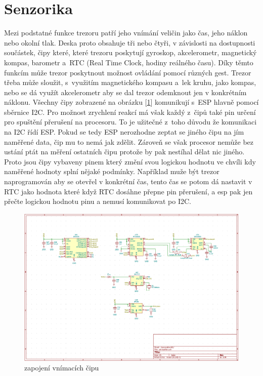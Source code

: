 \section{Senzorika}


Mezi podstatné funkce trezoru patří jeho vnímání veličin jako čas, jeho náklon nebo okolní tlak.
Deska proto obsahuje tři nebo čtyři, v závislosti na dostupnosti součástek, čipy které, které trezoru poskytují gyroskop, akcelerometr, magnetický kompas,
barometr a~RTC (Real Time Clock, hodiny reálného času). Díky těmto funkcím může trezor poskytnout možnost ovládání pomocí různých gest. Trezor třeba může 
sloužit, s~využitím magnetického kompasu a~lek kruhu, jako kompas, nebo se dá využít akcelerometr aby se dal trezor odemknout jen v konkrétním náklonu.
Všechny čipy zobrazené na obrázku [\ref{fig:E4-sch_vnimani}] komunikují s~ESP hlavně pomocí sběrnice I2C. Pro možnost zrychlení reakcí má však každý 
z~čipů také pin určení pro spuštění přerušení na procesoru. To je užitečné z~toho důvodu že komunikaci na I2C řídí ESP. Pokud se tedy ESP nerozhodne 
zeptat se jiného čipu na jím naměřené data, čip mu to nemá jak zdělit. Zároveň se však procesor nemůže bez ustání ptát na měření ostatních čipu 
protože by pak nestíhal dělat nic jiného. Proto jsou čipy vybaveny pinem který změní svou logickou hodnotu ve chvíli kdy naměřené hodnoty splní nějaké 
podmínky. 
Například muže být trezor naprogramován aby se otevřel v konkrétní čas, tento čas se potom dá nastavit v RTC jako hodnota které když RTC 
dosáhne přepne pin přerušení, a esp pak jen přečte logickou hodnotu pinu a nemusí komunikovat po I2C. %

\begin{figure}[htbp]
    \centering
    \includegraphics[width=\textwidth]{kapitoly/obrazky/E4/vnimani/sch.png}
    \caption{zapojení vnímacích čipu}
    \label{fig:E4-sch_vnimani}
\end{figure}

